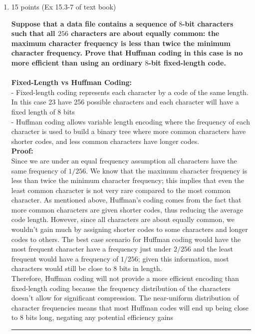 \documentclass[letterpaper,12pt]{article}
\begin{document}
\begin{enumerate}
\item 15 points (Ex 15.3-7 of text book)

\textbf{Suppose that a data file contains a sequence of $8$-bit characters such that all
$256$ characters are about equally common: the maximum character frequency is less
than twice the minimum character frequency. Prove that Huffman coding in this
case is no more efficient than using an ordinary $8$-bit fixed-length code.} \\ \\
\textbf{Fixed-Length vs Huffman Coding:} \\
- Fixed-length coding represents each character by a code of the same length. In this case 23 have 256 possible characters and each character will have a fixed length of 8 bits \\
- Huffman coding allows variable length encoding where the frequency of each character is used to build a binary tree where more common characters have shorter codes, and less common characters have longer codes. \\

\textbf{Proof:} \\
Since we are under an equal frequency assumption all characters have the same frequency of $1/256$. We know that the maximum character frequency is less than twice the minimum character frequency; this implies that even the least common character is not very rare compared to the most common character. As mentioned above, Huffman's coding comes from the fact that more common characters are given shorter codes, thus reducing the average code length. However, since all characters are about equally common, we wouldn't gain much by assigning shorter codes to some characters and longer codes to others. The best case scenario for Huffman coding would have the most frequent character have a frequency just under $2/256$ and the least frequent would have a frequency of $1/256$; given this information, most characters would still be close to 8 bits in length. \\

Therefore, Huffman coding will not provide a more efficient encoding than fixed-length coding because the frequency distribution of the characters doesn't allow for significant compression. The near-uniform distribution of character frequencies means that most Huffman codes will end up being close to 8 bits long, negating any potential efficiency gains 

\noindent\rule{16cm}{0.1pt}


\end{enumerate}
\end{document}
